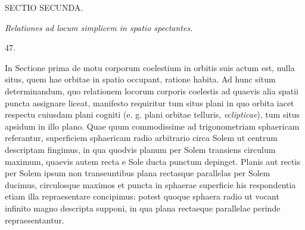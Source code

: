 \clearpage
{}
\begin{center}
{\large SECTIO SECUNDA.}\par\medskip
\emph{Relationes ad locum simplicem in spatio spectantes.}\par\bigskip
\hypertarget{native-065-article047}{}47.
\end{center}
In Sectione prima de motu corporum coelestium in orbitis suis actum est, nulla situs, quem hae orbitae in spatio occupant, ratione habita. Ad hunc situm determinandum, quo relationem locorum corporis coelestis ad quaevis alia spatii puncta assignare liceat, manifesto requiritur tum situs plani in quo orbita iacet respectu cuiusdam plani cogniti (e. g. plani orbitae telluris, \emph{eclipticae}), tum situs apsidum in illo plano. Quae quum commodissime ad trigonometriam sphaericam referantur, superficiem sphaericam radio arbitrario circa Solem ut centrum descriptam fingimus, in qua quodvis planum per Solem transiens circulum maximum, quaevis autem recta e Sole ducta punctum depinget. Planis aut rectis per Solem ipsum non transeuntibus plana rectasque parallelas per Solem ducimus, circulosque maximos et puncta in sphaerae superficie his respondentia etiam illa repraesentare concipimus: potest quoque sphaera radio ut vocant infinito magno descripta supponi, in qua plana rectaeque parallelae perinde repraesentantur.

